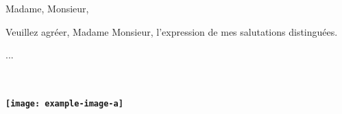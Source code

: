 \documentclass[11pt,a4paper]{moderncv}
\makeatletter
\renewcommand*{\makeletterclosing}{
  \@closing\\[3em]%
  {\null\hfill\bfseries \@firstname~\@lastname\\[1em]
  \null\hfill\texttt{[image: example-image-a]}}%
  \ifthenelse{\isundefined{\@enclosure}}{}{%
    \\%
    \vfill%
    {\color{color2}\itshape\enclname: \@enclosure}}}
\makeatother
\begin{document}
\date{\today}
\opening{Madame, Monsieur,}
\closing{Veuillez agréer, Madame Monsieur, l'expression de mes salutations distinguées.}
\makelettertitle\justifying

...

\bigskip

\makeletterclosing
\end{document}
